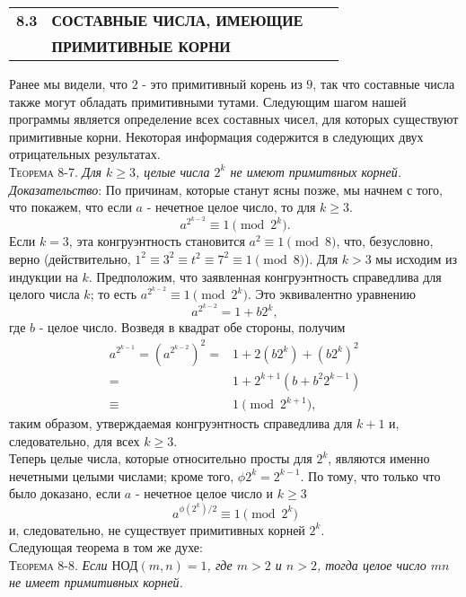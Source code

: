 \documentclass[11pt]{article}
\begin{document}
\newpage
{}

\begin{tabular}{llll}
\textbf{8.3} \quad & \textbf{СОСТАВНЫЕ ЧИСЛА, ИМЕЮЩИЕ} \\ & \textbf{ПРИМИТИВНЫЕ КОРНИ}
\end{tabular}

Ранее мы видели, что $2$ - это примитивный корень из $9$, так что составные числа также могут обладать примитивными тутами. Следующим шагом нашей программы является определение всех составных чисел, для которых существуют примитивные корни. Некоторая информация содержится в следующих двух отрицательных результатах. \\
\textsc{Теорема 8-7.} \textsl{Для $k \geq 3$, целые числа $2^k$ не имеют примитвных корней.} \\
\emph{Доказательство}: По причинам, которые станут ясны позже, мы начнем с того, что покажем, что если $a$ - нечетное целое число, то для $k \geq 3$.
\begin{equation*}
    a^{2^{k-2}} \equiv 1 \pmod{2^{k}}.
\end{equation*}
Если $k = 3$, эта конгруэнтность становится $a^2 \equiv 1 \pmod{8}$, что, безусловно, верно (действительно, $1^2 \equiv 3^2 \equiv t^2 \equiv 7^2 \equiv 1 \pmod{8}$). Для $k > 3$ мы исходим из индукции на $k$. Предположим, что заявленная конгруэнтность справедлива для целого числа $k$; то есть $a^{2^{k-2}} \equiv 1 \pmod{2^k}$. Это эквивалентно уравнению \\
\begin{equation*}
    a^{2^{k-2}} = 1 + b2^{k},
\end{equation*}
где $b$ - целое число. Возведя в квадрат обе стороны, получим
\begin{align*}
    a^{2^{k-1}} = (a^{2^{k-2}})^2 =& 1 + 2(b2^k) + (b2^k)^2 \\ =& 1 + 2^{k+1}(b+b^{2}2^{k-1}) \\ \equiv& 1 \pmod{2^{k+1}},
\end{align*}
таким образом, утверждаемая конгруэнтность справедлива для $k + 1$ и, следовательно, для всех $k \geq 3$. \\
Теперь целые числа, которые относительно просты для $2^k$, являются именно нечетными целыми числами; кроме того, $\phi{2^{k}} = 2^{k-1}$. По тому, что только что было доказано, если $a$ - нечетное целое число и $k \geq 3$
\begin{equation*}
    a^{\phi(2^{k})/2} \equiv 1 \pmod{2^k}
\end{equation*}
и, следовательно, не существует примитивных корней $2^k$. \\
Следующая теорема в том же духе: \\
\textsc{Теорема 8-8.} \textsl{Если $\text{НОД}(m,n)=1$, где $m>2$ и $n>2$, тогда целое число $mn$ не имеет примитивных корней.}
\end{document}

